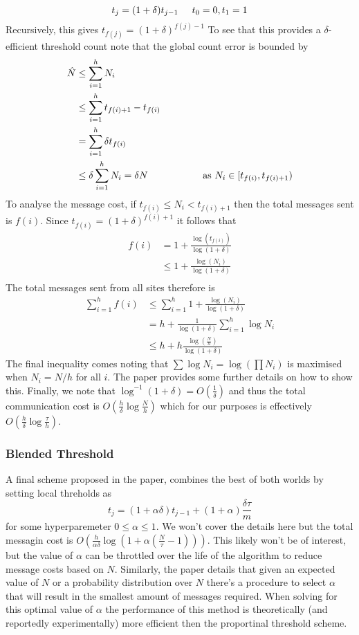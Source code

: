\documentclass{article}
\begin{document}
$$t_j = (1+\delta)t_{j-1} \hspace{5mm} t_0 = 0, t_1 =1 $$
Recursively, this gives $t_{f(j)} = (1+\delta)^{f(j)-1}$ To see that this provides a $\delta$-efficient threshold count note that the global count error is bounded by 
\begin{align*}
    \hat{N} &\leq \sum_{i=1}^{h}N_i \\
            &\leq \sum_{i=1}^{h} t_{f(i)+1} - t_{f(i)}\\
            &=\sum_{i=1}^{h} \delta t_{f(i)} \\
            &\leq \delta \sum_{i=1}^{h}N_i = \delta N \hspace{20mm} \text{as $N_i\in [t_{f(i)}, t_{f(i)+1})$}
\end{align*}
To analyse the message cost, if $t_{f(i)}\leq N_i < t_{f(i)+1}$
then the total messages sent is $f(i)$. Since $t_{f(i)} = (1+\delta)^{f(i)+1}$ it follows that 
\begin{align*}
    f(i) &= 1 + \frac{\log (t_{f(i)})}{\log(1+\delta)} \\
         &\leq 1 + \frac{\log (N_i)}{\log(1+\delta)} \\
\end{align*}
The total messages sent from all sites therefore is 
\begin{align*}
    \sum_{i=1}^{h} f(i) &\leq \sum_{i=1}^{h}1 + \frac{\log (N_i)}{\log(1+\delta)} \\
    &= h + \frac{1}{\log(1+\delta)}\sum_{i=1}^{h}\log N_i \\
    &\leq h + h\frac{\log(\frac{N}{h})}{\log(1+\delta)}
\end{align*}
The final inequality comes noting that $\sum \log N_i = \log(\prod N_i)$ is maximised when $N_i = N/h$ for all $i$. The paper provides some further details on how to show this. Finally, we note that $\log^{-1}(1+\delta) = O(\frac{1}{\delta})$ and thus the total communication cost is $O(\frac{h}{\delta}\log\frac{N}{h})$ which for our purposes is effectively $O(\frac{h}{\delta}\log\frac{\tau}{h})$.

\subsubsection*{Blended Threshold}
A final scheme proposed in the paper, combines the best of both worlds by setting local threholds as 
$$t_j = (1+\alpha\delta)t_{j-1} + (1+\alpha)\frac{\delta\tau}{m}$$
for some hyperparemeter $0\leq\alpha\leq1$. We won't cover the details here but the total messagin cost is $O(\frac{h}{\alpha\delta}\log(1+\alpha(\frac{N}{\tau}-1)))$. This likely won't be of interest, but the value of $\alpha$ can be throttled over the life of the algorithm to reduce message costs based on $N$. Similarly, the paper details that given an expected value of $N$ or a probability distribution over $N$ there's a procedure to select $\alpha$ that will result in the smallest amount of messages required. When solving for this optimal value of $\alpha$ the performance of this method is theoretically (and reportedly experimentally) more efficient then the proportinal threshold scheme.
\end{document}
